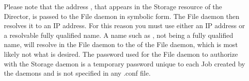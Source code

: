 Please note that the address , that appears in the Storage
resource of the Director,
is passed to the File daemon in symbolic form. The File daemon then resolves it
to an IP address. For this reason you must use either an IP address or a
resolvable fully qualified name. A name such as , not being a fully
qualified name, will resolve in the File daemon to the  of the File
daemon, which is most likely not what is desired. The password used for the
File daemon to authorize with the Storage daemon is a temporary password
unique to each Job created by the daemons and is not specified in any .conf
file.
